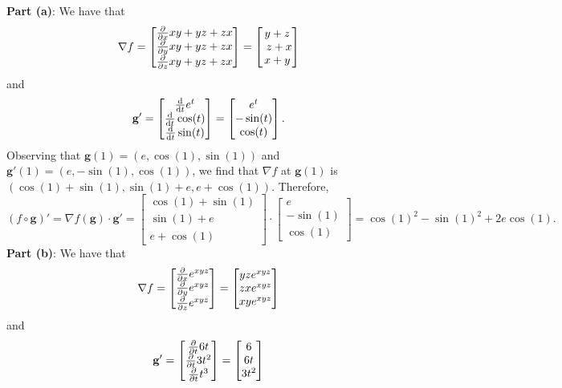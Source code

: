 \documentclass[11pt]{article}
\newcommand{\mat}[1]{\mathbf{#1}}
\renewcommand{\grad}{\nabla}
\begin{document}
\textbf{Part (a)}: We have that
\[
	\grad f = \begin{bmatrix} \pdv{x} xy + yz + zx \\ \pdv{y} xy + yz + zx \\ \pdv{z} xy + yz + zx \end{bmatrix} = \begin{bmatrix} y + z \\\ z + x \\ x + y \end{bmatrix}
\]
and
\[
	\mat{g}' = \begin{bmatrix} \dv{t} e^{t} \\ \dv{t} \cos(t) \\ \dv{t} \sin(t) \end{bmatrix} = \begin{bmatrix} e^{t} \\ -\sin(t) \\ \cos(t) \end{bmatrix}.
\]
Observing that $\mat{g}(1) = (e, \cos(1), \sin(1))$ and $\mat{g}'(1) = (e, -\sin(1), \cos(1))$, we find that $\grad f$ at $\mat{g}(1)$ is $(\cos(1) + \sin(1), \sin(1) + e, e + \cos(1))$. Therefore,
\[
	(f \circ \mat{g})' = \grad f (\mat{g}) \cdot \mat{g}' = \begin{bmatrix} \cos(1) + \sin(1) \\ \sin(1) + e \\ e + \cos(1) \end{bmatrix} \cdot \begin{bmatrix} e \\ -\sin(1) \\ \cos(1) \end{bmatrix} = \boxed{\cos(1)^{2} - \sin(1)^{2} + 2e \cos(1)}.
\]
\textbf{Part (b)}: We have that
\[
	\grad f = \begin{bmatrix} \pdv{x} e^{xyz} \\ \pdv{y} e^{xyz} \\ \pdv{z} e^{xyz} \end{bmatrix} = \begin{bmatrix} yz e^{xyz} \\ zx e^{xyz} \\ xy e^{xyz} \end{bmatrix}
\]
and
\[
	\mat{g}' = \begin{bmatrix} \pdv{t} 6t \\ \pdv{t} 3t^{2} \\ \pdv{t} t^{3} \end{bmatrix} = \begin{bmatrix} 6 \\ 6t \\ 3t^{2} \end{bmatrix}
\]
\end{document}
